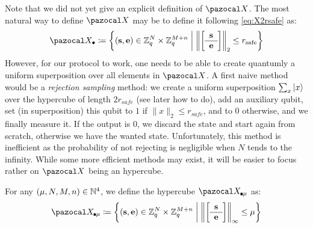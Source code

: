 {  Note that we did not yet give an explicit definition of $\ccX$. The most natural way to define $\ccX$ may be to define it following \cref{eq:X2rsafe} as:
  \begin{align}
    \ccXSphere \eqdef \left\{(\vect{s}, \vect{e}) \in \Z_q^N \times \Z_q^{M+n} \middle| \left\|\SmallBlockMatrix{\vect{s}}{\vect{e}}\right\|_2 \leq \rsafe \right\}
  \end{align}
  However, for our protocol to work, one needs to be able to create quantumly a uniform superposition over all elements in $\ccX$. A first naive method would be a \emph{rejection sampling} method: we create a uniform superposition $\sum_x \ket{x}$ over the hypercube of length $2r_{safe}$ (see later how to do), add an auxiliary qubit, set (in superposition) this qubit to $1$ if $\|x\|_2 \leq r_{safe}$, and to $0$ otherwise, and we finally measure it. If the output is $0$, we discard the state and start again from scratch, otherwise we have the wanted state. Unfortunately, this method is inefficient as the probability of not rejecting is negligible when $N$ tends to the infinity. While some more efficient methods may exist, it will be easier to focus rather on $\cX$ being an hypercube.
  \begin{definition} For any $(\mu,N,M,n) \in \mathbb{N}^4$, we define the hypercube $\ccXCube[\mu]$ as:
    \begin{align}
      \ccXCube[\mu] \eqdef \left\{(\vect{s}, \vect{e}) \in \Z_q^N \times \Z_q^{M+n} \middle| \left\|\SmallBlockMatrix{\vect{s}}{\vect{e}}\right\|_\infty \leq \mu \right\}
    \end{align}
  \end{definition}

}
